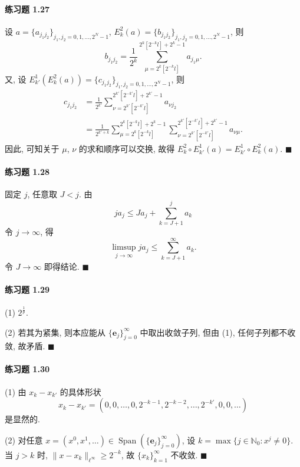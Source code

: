 \paragraph*{练习题 1.27}
设 $a = \{a_{j_{1}j_{2}}\}_{j_{1},j_{2}=0,1,\ldots,2^{N}-1}$, $E_{k}^{2}(a) = \{b_{j_{1}j_{2}}\}_{j_{1},j_{2}=0,1,\ldots,2^{N}-1}$, 则
\[
b_{j_{1}j_{2}} = \frac{1}{2^{k}}\sum_{\mu=2^{k}[2^{-k}l]}^{2^{k}[2^{-k}l]+2^{k}-1}a_{j_{1}\mu}.
\]
又, 设 $E_{k'}^{1}(E_{k}^{2}(a)) = \{c_{j_{1}j_{2}}\}_{j_{1},j_{2}=0,1,\ldots,2^{N}-1}$, 则
\begin{align*}
c_{j_{1}j_{2}} &= \frac{1}{2^{k'}}\sum_{\nu=2^{k'}[2^{-k'}l]}^{2^{k'}[2^{-k'}l]+2^{k'}-1}a_{\nu j_{2}} \\
&= \frac{1}{2^{k'+k}}\sum_{\mu=2^{k}[2^{-k}l]}^{2^{k}[2^{-k}l]+2^{k}-1}\sum_{\nu=2^{k'}[2^{-k'}l]}^{2^{k'}[2^{-k'}l]+2^{k'}-1}a_{\nu\mu}.
\end{align*}
因此, 可知关于 $\mu$, $\nu$ 的求和顺序可以交换, 故得 $E_{k}^{2} \circ E_{k'}^{1}(a) = E_{k'}^{1} \circ E_{k}^{2}(a)$. $\blacksquare$

\paragraph*{练习题 1.28}
固定 $j$, 任意取 $J < j$. 由
\[
ja_{j} \leq Ja_{j} + \sum_{k=J+1}^{j}a_{k}
\]
令 $j \to \infty$, 得
\[
\limsup_{j \to \infty}ja_{j} \leq \sum_{k=J+1}^{\infty}a_{k}.
\]
令 $J \to \infty$ 即得结论. $\blacksquare$

\paragraph*{练习题 1.29}
(1) $2^{\frac{1}{p}}$.

(2) 若其为紧集, 则本应能从 $\{\mathbf{e}_{j}\}_{j=0}^{\infty}$ 中取出收敛子列, 但由 (1), 任何子列都不收敛, 故矛盾. $\blacksquare$

\paragraph*{练习题 1.30}
(1) 由 $x_{k} - x_{k'}$ 的具体形状
\[
x_{k} - x_{k'} = (0, 0, \ldots, 0, 2^{-k-1}, 2^{-k-2}, \ldots, 2^{-k'}, 0, 0, \ldots)
\]
是显然的.

(2) 对任意 $x = (x^{0}, x^{1}, \ldots) \in \operatorname{Span}(\{\mathbf{e}_{j}\}_{j=0}^{\infty})$, 设 $k = \max\{j \in \mathbb{N}_{0} : x^{j} \neq 0\}$. 当 $j > k$ 时, $\|x - x_{k}\|_{\ell^{\infty}} \geq 2^{-k}$, 故 $\{x_{k}\}_{k=1}^{\infty}$ 不收敛. $\blacksquare$

